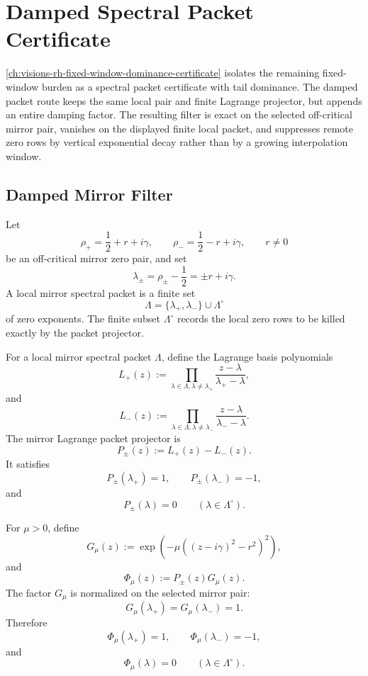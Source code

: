 \chapter{Damped Spectral Packet Certificate}
\label{ch:visions-rh-damped-spectral-packet-certificate}

\autoref{ch:visions-rh-fixed-window-dominance-certificate} isolates the
remaining fixed-window burden as a spectral packet certificate with
tail dominance.  The damped packet route keeps the same local pair and
finite Lagrange projector, but appends an entire damping factor.  The
resulting filter is exact on the selected off-critical mirror pair,
vanishes on the displayed finite local packet, and suppresses remote
zero rows by vertical exponential decay rather than by a growing
interpolation window.

\section{Damped Mirror Filter}
\label{sec:rh-damped-spectral-mirror-filter}

\begin{definition}
\label{def:rh-local-mirror-spectral-packet}
Let
$$
\rho_+=\frac12+r+i\gamma,
\qquad
\rho_-=\frac12-r+i\gamma,
\qquad
r\ne0
$$
be an off-critical mirror zero pair, and set
$$
\lambda_\pm=\rho_\pm-\frac12=\pm r+i\gamma.
$$
A local mirror spectral packet is a finite set
$$
\Lambda=\{\lambda_+,\lambda_-\}\cup\Lambda^\circ
$$
of zero exponents.  The finite subset $\Lambda^\circ$ records the local
zero rows to be killed exactly by the packet projector.
\end{definition}

\begin{definition}
\label{def:rh-mirror-lagrange-packet-projector}
For a local mirror spectral packet $\Lambda$, define the Lagrange basis
polynomials
$$
L_+(z)
:=
\prod_{\lambda\in\Lambda,\lambda\ne\lambda_+}
\frac{z-\lambda}{\lambda_+-\lambda},
$$
and
$$
L_-(z)
:=
\prod_{\lambda\in\Lambda,\lambda\ne\lambda_-}
\frac{z-\lambda}{\lambda_--\lambda}.
$$
The mirror Lagrange packet projector is
$$
P_\pm(z):=L_+(z)-L_-(z).
$$
It satisfies
$$
P_\pm(\lambda_+)=1,
\qquad
P_\pm(\lambda_-)=-1,
$$
and
$$
P_\pm(\lambda)=0
\qquad
(\lambda\in\Lambda^\circ).
$$
\end{definition}

\begin{definition}
\label{def:rh-damped-mirror-packet-filter}
For $\mu>0$, define
$$
G_\mu(z)
:=
\exp\left(
-\mu\left((z-i\gamma)^2-r^2\right)^2
\right),
$$
and
$$
\Phi_\mu(z):=P_\pm(z)G_\mu(z).
$$
The factor $G_\mu$ is normalized on the selected mirror pair:
$$
G_\mu(\lambda_+)=G_\mu(\lambda_-)=1.
$$
Therefore
$$
\Phi_\mu(\lambda_+)=1,
\qquad
\Phi_\mu(\lambda_-)=-1,
$$
and
$$
\Phi_\mu(\lambda)=0
\qquad
(\lambda\in\Lambda^\circ).
$$
\end{definition}

